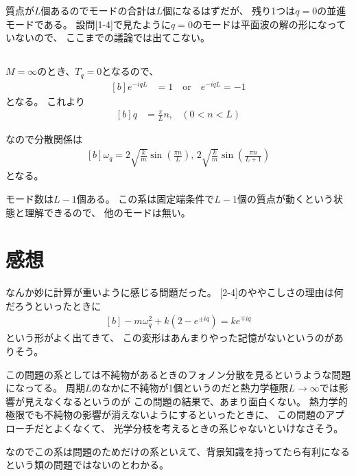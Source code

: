\documentclass[../ap_2022.tex]{subfiles}
\begin{document}
質点が\(L\)個あるのでモードの合計は\(L\)個になるはずだが、
残り1つは\(q=0\)の並進モードである。
設問[1-4]で見たように\(q=0\)のモードは平面波の解の形になっていないので、
ここまでの議論では出てこない。


\subsection{}
\(M=\infty\)のとき、\(T_q = 0\)となるので、
\begin{equation}\begin{aligned}[b]
    e^{-iqL} &= 1\quad\text{or}\quad
        e^{-iqL}=-1
\end{aligned}\end{equation}
となる。
これより
\begin{equation}\begin{aligned}[b]
    q &= \frac{\pi}{L}n, & (0<n<L)
\end{aligned}\end{equation}

なので分散関係は
\begin{equation}\begin{aligned}[b]
    \omega_q = 2\sqrt{\frac{k}{m}}\sin(\frac{\pi n}{L}),\,2\sqrt{\frac{k}{m}}\sin(\frac{\pi n}{L+1})
\end{aligned}\end{equation}
となる。

モード数は\(L-1\)個ある。
この系は固定端条件で\(L-1\)個の質点が動くという状態と理解できるので、
他のモードは無い。

\section*{感想}
なんか妙に計算が重いように感じる問題だった。
[2-4]のややこしさの理由は何だろうといったときに
\begin{equation*}\begin{aligned}[b]
    -m\omega_q^2+k(2-e^{\pm iq}) = ke^{\mp iq}
\end{aligned}\end{equation*}
という形がよく出てきて、
この変形はあんまりやった記憶がないというのがありそう。

この問題の系としては不純物があるときのフォノン分散を見るというような問題になってる。
周期\(L\)のなかに不純物が1個というのだと熱力学極限\(L\to \infty\)では影響が見えなくなるというのが
この問題の結果で、あまり面白くない。
熱力学的極限でも不純物の影響が消えないようにするといったときに、
この問題のアプローチだとよくなくて、
光学分枝を考えるときの系じゃないといけなさそう。

なのでこの系は問題のためだけの系といえて、背景知識を持ってたら有利になるという類の問題ではないのとわかる。
\end{document}
